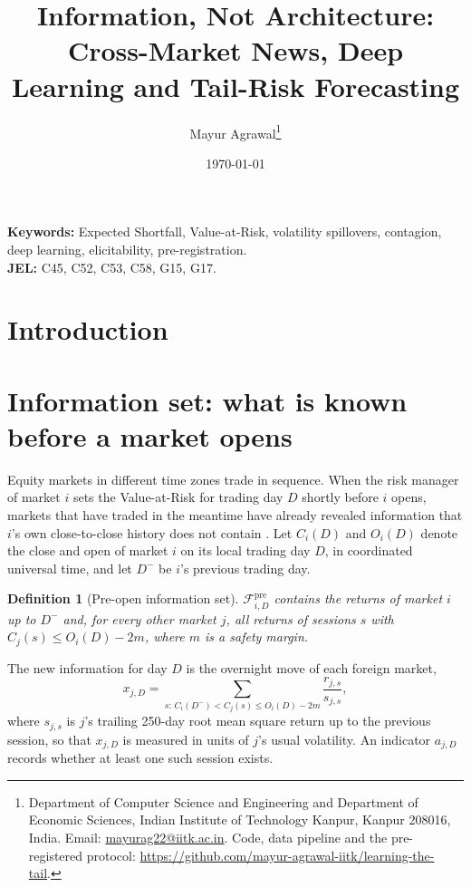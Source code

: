 \documentclass[11pt]{article}
\title{Information, Not Architecture: Cross-Market News, Deep Learning and Tail-Risk Forecasting}
\author{Mayur Agrawal\thanks{Department of Computer Science and Engineering and Department of Economic Sciences, Indian Institute of Technology Kanpur, Kanpur 208016, India. Email: \href{mailto:mayurag22@iitk.ac.in}{mayurag22@iitk.ac.in}. Code, data pipeline and the pre-registered protocol: \url{https://github.com/mayur-agrawal-iitk/learning-the-tail}.}}
\date{\today}
\newtheorem{definition}{Definition}
\theoremstyle{remark}
\newcommand{\1}{\mathbf{1}}
\newcommand{\F}{\mathcal{F}}
\begin{document}
\maketitle

\begin{abstract}

\end{abstract}

\noindent\textbf{Keywords:} Expected Shortfall, Value-at-Risk, volatility spillovers, contagion, deep learning, elicitability, pre-registration.\\
\noindent\textbf{JEL:} C45, C52, C53, C58, G15, G17.

\section{Introduction}\label{sec:intro}


\section{Information set: what is known before a market opens}\label{sec:info}
Equity markets in different time zones trade in sequence. When the risk manager of market $i$ sets the Value-at-Risk for trading day $D$ shortly before $i$ opens, markets that have traded in the meantime have already revealed information that $i$'s own close-to-close history does not contain \citep{hamao1990correlations,lin1994do}. Let $C_i(D)$ and $O_i(D)$ denote the close and open of market $i$ on its local trading day $D$, in coordinated universal time, and let $D^-$ be $i$'s previous trading day.

\begin{definition}[Pre-open information set]
$\F^{\mathrm{pre}}_{i,D}$ contains the returns of market $i$ up to $D^-$ and, for every other market $j$, all returns of sessions $s$ with $C_j(s)\le O_i(D)-2m$, where $m$ is a safety margin.
\end{definition}

The new information for day $D$ is the overnight move of each foreign market,
\begin{equation}\label{eq:news}
x_{j,D}=\sum_{s:\,C_i(D^-)<C_j(s)\le O_i(D)-2m}\frac{r_{j,s}}{s_{j,s}},
\end{equation}
where $s_{j,s}$ is $j$'s trailing 250-day root mean square return up to the previous session, so that $x_{j,D}$ is measured in units of $j$'s usual volatility. An indicator $a_{j,D}$ records whether at least one such session exists.
\end{document}

